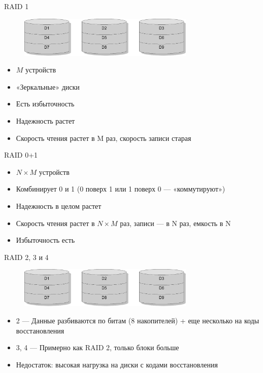\documentclass[xetex,aspectratio=43]{beamer}
\begin{document}
\begin{frame}{RAID 1}
    \begin{figure}
        \includegraphics[width=0.75\textwidth, page=2]{img/10.raids-crop.pdf}
    \end{figure}

\begin{itemize}
\tightlist
\item
  \(M\) устройств
\item
  «Зеркальные» диски
\item
  Есть избыточность
\item
  Надежность растет
\item
  Скорость чтения растет в M раз, скорость записи старая
\end{itemize}
\end{frame}

\begin{frame}
\begin{block}{RAID 0+1}
\begin{itemize}
\tightlist
\item
  \(N\times M\) устройств
\item
  Комбинирует 0 и 1 (0 поверх 1 или 1 поверх 0 --- «коммутируют»)
\item
  Надежность в целом растет
\item
  Скорость чтения растет в \(N\times M\) раз, записи --- в N раз,
  емкость в N
\item
  Избыточность есть
\end{itemize}
\end{block}
\end{frame}

\begin{frame}{RAID 2, 3 и 4}
    \begin{figure}
        \includegraphics[width=0.75\textwidth, page=3]{img/10.raids-crop.pdf}
    \end{figure}

\begin{itemize}
\tightlist
\item
  2 --- Данные разбиваются по битам (8 накопителей) + еще несколько на
  коды восстановления
\item
  3, 4 --- Примерно как RAID 2, только блоки больше
\item
  Недостаток: высокая нагрузка на диски с кодами восстановления
\end{itemize}
\end{frame}
\end{document}
